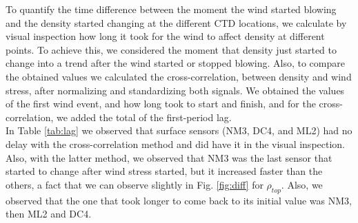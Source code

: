 \documentclass[tesis.tex]{subfiles}
\begin{document}
To quantify the time difference between the moment the wind started blowing and the density started changing at the different CTD locations, we calculate by visual inspection how long it took for the wind to affect density at different points. To achieve this, we considered the moment that density just started to change into a trend after the wind started or stopped blowing. Also, to compare the obtained values we calculated the cross-correlation, between density and wind stress, after normalizing and standardizing both signals. We obtained the values of the first wind event, and how long took to start and finish, and for the cross-correlation, we added the total of the first-period lag.\\

In Table \ref{tab:lag} we observed that surface sensors (NM3, DC4, and ML2) had no delay with the cross-correlation method and did have it in the visual inspection. Also, with the latter method, we observed that NM3 was the last sensor that started to change after wind stress started, but it increased faster than the others, a fact that we can observe slightly in Fig. \ref{fig:diff} for $\rho_{top}$. Also, we observed that the one that took longer to come back to its initial value was NM3, then ML2 and DC4.\\
\end{document}
